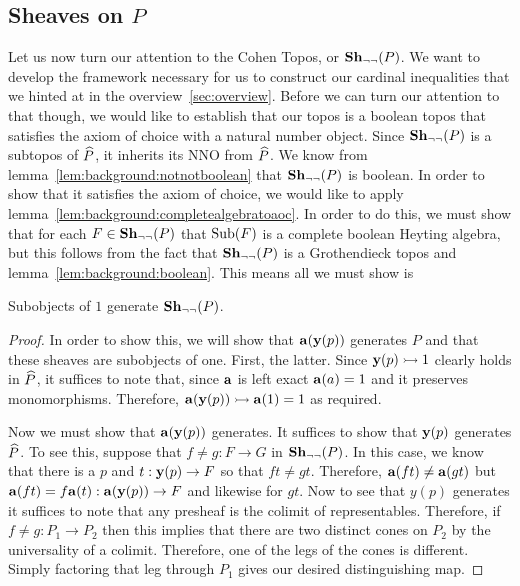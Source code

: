 \subsection{Sheaves on \texorpdfstring{$P$}{P}}\label{subsec:presheaves}\hfill

Let us now turn our attention to the Cohen Topos, or
$\sheaves[\neg\neg]{P}$. We want to develop the framework necessary
for us to construct our cardinal inequalities that we hinted at in the
overview~\ref{sec:overview}. Before we can turn our attention to that
though, we would like to establish that our topos is a boolean topos
that satisfies the axiom of choice with a natural number object. Since
$\sheaves[\neg\neg]{P}$ is a subtopos of $\presheaf{P}$, it inherits
its NNO from $\presheaf{P}$. We know from
lemma~\ref{lem:background:notnotboolean} that $\sheaves[\neg\neg]{P}$
is boolean. In order to show that it satisfies the axiom of choice, we
would like to apply
lemma~\ref{lem:background:completealgebratoaoc}. In order to do this,
we must show that for each $F \in \sheaves[\neg\neg]{P}$ that
$\sub(F)$ is a complete boolean Heyting algebra, but this follows from
the fact that $\sheaves[\neg\neg]{P}$ is a Grothendieck topos and
lemma~\ref{lem:background:boolean}. This means all we must show is

\begin{lem}
  Subobjects of $1$ generate $\sheaves[\neg\neg]{P}$.
\end{lem}
\begin{proof}
  In order to show this, we will show that $\sheafify(\yoneda(p))$
  generates $P$ and that these sheaves are subobjects of one. First,
  the latter. Since $\yoneda(p) \mono 1$ clearly holds in $\presheaf{P}$, it
  suffices to note that, since $\sheafify$ is left exact
  $\sheafify(a) = 1$ and it preserves monomorphisms. Therefore,
  $\sheafify(\yoneda(p)) \mono \sheafify(1) = 1$ as required.

  Now we must show that $\sheafify(\yoneda(p))$ generates. It suffices
  to show that $\yoneda(p)$ generates $\presheaf{P}$. To see this,
  suppose that $f \neq g : F \to G$ in $\sheaves[\neg\neg]{P}$. In
  this case, we know that there is a $p$ and $t : \yoneda(p) \to F$ so
  that $ft \neq gt$. Therefore, $\sheafify(ft) \neq \sheafify(gt)$ but
  $\sheafify(ft) = f\sheafify(t) : \sheafify(\yoneda(p)) \to F$ and
  likewise for $gt$. Now to see that $y(p)$ generates it suffices to
  note that any presheaf is the colimit of representables. Therefore,
  if $f \neq g : P_1 \to P_2$ then this implies that there are two
  distinct cones on $P_2$ by the universality of a colimit. Therefore,
  one of the legs of the cones is different. Simply factoring that leg
  through $P_1$ gives our desired distinguishing map.
\end{proof}



